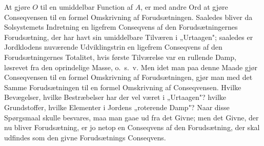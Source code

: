 \documentclass[12pt]{book}
\newcommand{\opage}[1]{\marginnote{\footnotesize\textit{[#1]}}}
\begin{document}
At gjøre $O$ til en umiddelbar Function af $A$, er med andre Ord at gjøre Conseqvensen til en formel
Omskrivning af Forudsætningen. Saaledes bliver da Solsystemets Indretning en ligefrem Conseqvens af
den Forudsætningernes Forudsætning, der har havt sin umiddelbare Tilværen i „Urtaagen"; saaledes er
Jordklodens nuværende Udviklingstrin en ligefrem Conseqvens af den Forudsætningernes Totalitet, hvis
første Tilværelse var en rullende Damp, løsrevet fra den oprindelige Masse, o.\ s.\ v. Men idet man
paa denne Maade gjør Conseqvensen til en formel Omskrivning af Forudsætningen, gjør man med det Samme
Forudsætningen til en formel Omskrivning af Conseqvensen. Hvilke Bevægelser, hvilke Bestræbelser har
der vel været i „Urtaagen"? hvilke Grundstoffer, hvilke Elementer i Jordens „roterende Damp"? Naar
disse Spørgsmaal skulle besvares, maa man gaae ud fra det Givne; men det Givne, der nu bliver
Forudsætning,
\opage{443} er jo netop en Conseqvens af den Forudsætning, der skal udfindes som den givne Forudsætnings
Conseqvens.
\end{document}

